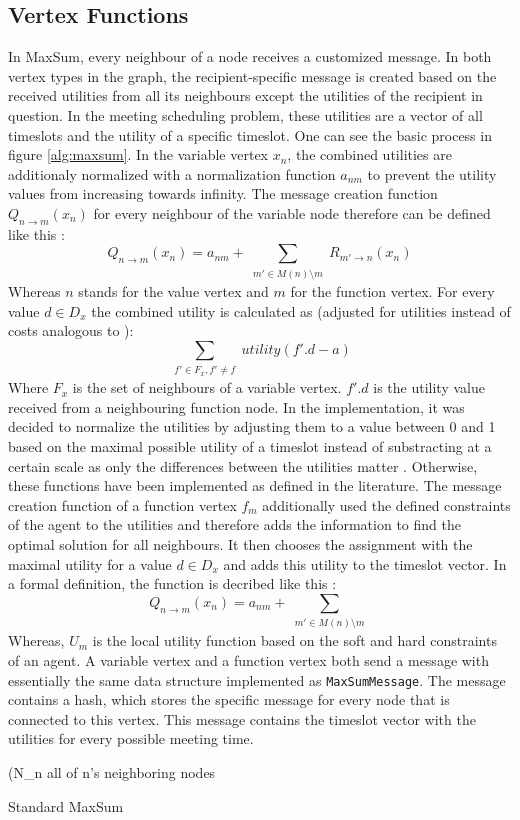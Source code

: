 \subsection{Vertex Functions} 
In MaxSum, every neighbour of a node receives a customized message. In both vertex types in the graph, the recipient-specific message is created based on the received utilities from all its neighbours except the utilities of the recipient in question. In the meeting scheduling problem, these utilities are a vector of all timeslots and the utility of a specific timeslot. One can see the basic process in figure \ref{alg:maxsum}.
In the variable vertex \(x_{n}\), the combined utilities are additionaly normalized with a normalization function \(a_{nm}\) to prevent the utility values from increasing towards infinity. The message creation function \(Q_{n \rightarrow m}(x_{n})\) for every neighbour of the variable node therefore can be defined like this \cite{Farinelli2008}:
\[Q_{n \rightarrow  m}(x_{n}) = a_{nm} + \sum_{\substack{m' \in M (n) \setminus  m }} R_{m' \rightarrow n} (x_{n}) \]
Whereas \(n\) stands for the value vertex and \(m\) for the function vertex. For every value \(d \in D_{x}\) the combined utility is calculated as (adjusted for utilities instead of costs analogous to \cite{Zivan2012}):
\[\sum_{\substack{f' \in F_{x}, f' \neq f}}  utility(f'.d - a) \]
Where \(F_{x}\) is the set of neighbours of a variable vertex. \(f'.d\) is the utility value received from a neighbouring function node. In the implementation, it was decided to normalize the utilities by adjusting them to a value between 0 and 1 based on the maximal possible utility of a timeslot instead of substracting at a certain scale as only the differences between the utilities matter \cite{Zivan2012}. Otherwise, these functions have been implemented as defined in the literature.
The message creation function of a function vertex \(f_{m}\) additionally used the defined constraints of the agent to the utilities and therefore adds the information to find the optimal solution for all neighbours. It then chooses the assignment with the maximal utility for a value \(d \in D_{x}\) and adds this utility to the timeslot vector. In a formal definition, the function is decribed like this \cite{Farinelli2008}: 
\[Q_{n \rightarrow  m}(x_{n}) = a_{nm} + \sum_{\substack{m' \in M (n) \setminus m }}  \]
Whereas, \(U_{m}\) is the local utility function based on the soft and hard constraints of an agent.
A variable vertex and a function vertex both send a message with essentially the same data structure implemented as \texttt{MaxSumMessage}. The message contains a hash, which stores the specific message for every node that is connected to this vertex. This message contains the timeslot vector with the utilities for every possible meeting time.

\begin{algorithm}[H]
 (N_{n} \leftarrow all of n's neighboring nodes
 \caption{Standard MaxSum \cite{Zivan2012}}
 \label{alg:maxsum}
\end{algorithm}


